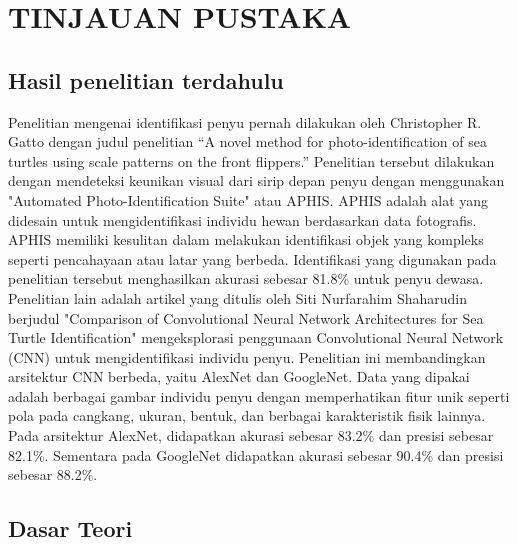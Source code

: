 \chapter{TINJAUAN PUSTAKA}
\section{Hasil penelitian terdahulu}
Penelitian mengenai identifikasi penyu pernah dilakukan oleh Christopher R. Gatto dengan judul penelitian “A novel method for photo-identification of sea turtles using scale patterns on the front flippers.” 
Penelitian tersebut dilakukan dengan mendeteksi keunikan visual dari sirip depan penyu dengan menggunakan "Automated Photo-Identification Suite" atau APHIS.
APHIS adalah alat yang didesain untuk mengidentifikasi individu hewan berdasarkan data fotografis.
APHIS memiliki kesulitan dalam melakukan identifikasi objek yang kompleks seperti pencahayaan atau latar yang berbeda.
Identifikasi yang digunakan pada penelitian tersebut menghasilkan akurasi sebesar 81.8\% untuk penyu dewasa. 
\parencite{GATTO201818}
Penelitian lain adalah artikel yang ditulis oleh Siti Nurfarahim Shaharudin berjudul "Comparison of Convolutional Neural Network Architectures for Sea Turtle Identification" mengeksplorasi penggunaan Convolutional Neural Network (CNN) untuk mengidentifikasi individu penyu.
Penelitian ini membandingkan arsitektur CNN berbeda, yaitu AlexNet dan GoogleNet.
Data yang dipakai adalah berbagai gambar individu penyu dengan memperhatikan fitur unik seperti pola pada cangkang, ukuran, bentuk, dan berbagai karakteristik fisik lainnya.
Pada arsitektur AlexNet, didapatkan akurasi sebesar 83.2\% dan presisi sebesar 82.1\%.
Sementara pada GoogleNet didapatkan akurasi sebesar 90.4\% dan presisi sebesar 88.2\%.
\parencite{10.1145/3616901.3617020}

\section{Dasar Teori}

